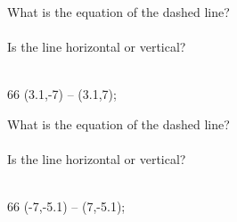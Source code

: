 \documentclass[12pt,letterpaper]{memoir}
\begin{document}
%
%
\myProblemsWithContent
{
    What is the equation of the dashed line? \\
    \\ 
    Is the line horizontal or vertical?\\
    \\
    \vspace{-2.5\onelineskip}
    \begin{flushright}
        \begin{myTikzpictureGrid}{0.3} {6}{6}
             (3.1,-7) -- (3.1,7);
            \whenTEACHER{
            }
        \end{myTikzpictureGrid}
    \end{flushright}
}
{
    What is the equation of the dashed line? \\
    \\ 
    Is the line horizontal or vertical?\\
    \\
    \vspace{-2.5\onelineskip}
    \begin{flushright}
        \begin{myTikzpictureGrid}{0.3} {6}{6}
             (-7,-5.1) -- (7,-5.1);
            \whenTEACHER{
            }
        \end{myTikzpictureGrid}
    \end{flushright}
}
\end{document}
